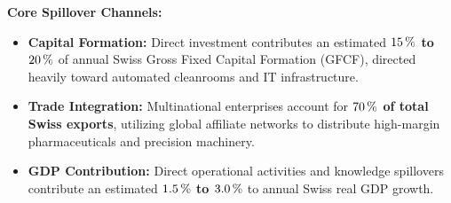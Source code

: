 \noindent\textbf{Core Spillover Channels:}
\begin{itemize}[leftmargin=1.5em, itemsep=1.5pt]
    \item \textbf{Capital Formation:} Direct investment contributes an estimated \textbf{$15\,\%$ to $20\,\%$} of annual Swiss Gross Fixed Capital Formation (GFCF), directed heavily toward automated cleanrooms and IT infrastructure.
    \item \textbf{Trade Integration:} Multinational enterprises account for \textbf{$70\,\%$ of total Swiss exports}, utilizing global affiliate networks to distribute high-margin pharmaceuticals and precision machinery.
    \item \textbf{GDP Contribution:} Direct operational activities and knowledge spillovers contribute an estimated \textbf{$1.5\,\%$ to $3.0\,\%$} to annual Swiss real GDP growth.
\end{itemize}

